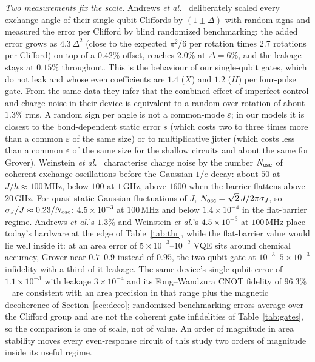 \documentclass[reprint,aps,pra,amsmath,amssymb,superscriptaddress,letterpaper]{revtex4-2}
\begin{document}
\emph{Two measurements fix the scale.} Andrews \emph{et
al.}~\cite{andrews2019} deliberately scaled every exchange angle of their
single-qubit Cliffords by $(1\pm\Delta)$ with random signs and measured the
error per Clifford by blind randomized benchmarking: the added error grows as $4.3\,\Delta^2$ (close to the expected $\pi^2/6$ per rotation times $2.7$ rotations per Clifford) on top of a $0.42\%$ offset, reaches $2.0\%$ at $\Delta=6\%$, and the leakage stays at $0.15\%$ throughout.
This is the behaviour of our single-qubit gates, which do not leak and whose even coefficients are $1.4$ ($X$) and $1.2$ ($H$) per four-pulse gate. From the same data they infer that the combined effect of imperfect control and charge noise in their device is equivalent to a random over-rotation of about $1.3\%$ rms. A random sign per angle is not a common-mode $\varepsilon$; in our models it is closest to the bond-dependent static error $s$ (which costs two to three times more than a common $\varepsilon$ of the same size) or to multiplicative jitter (which costs less than a common $\varepsilon$ of the same size for the shallow circuits and about the same for Grover). Weinstein \emph{et al.}~\cite{weinstein2023} characterise charge noise
by the number $N_{\rm osc}$ of coherent exchange oscillations before the
Gaussian $1/e$ decay: about $50$ at $J/h\approx100$\,MHz, below $100$ at
$1$\,GHz, above $1600$ when the barrier flattens above $20$\,GHz. For
quasi-static Gaussian fluctuations of $J$, $N_{\rm osc}=\sqrt2\,J/2\pi\sigma_J$,
so $\sigma_J/J\approx0.23/N_{\rm osc}$: $4.5\times10^{-3}$ at $100$\,MHz and below $1.4\times10^{-4}$ in the flat-barrier regime. Andrews \emph{et al.}'s $1.3\%$ and Weinstein \emph{et al.}'s $4.5\times10^{-3}$ at $100$\,MHz place today's hardware at the edge of Table~\ref{tab:thr}, while the flat-barrier value would lie well inside it: at an area error of $5\times10^{-3}$--$10^{-2}$ VQE sits around chemical accuracy, Grover near $0.7$--$0.9$ instead of $0.95$, the two-qubit gate at $10^{-3}$--$5\times10^{-3}$ infidelity with a third of it leakage. The same device's single-qubit error of $1.1\times10^{-3}$ with leakage $3\times10^{-4}$ and its Fong--Wandzura CNOT fidelity of $96.3\%$~\cite{weinstein2023} are consistent with an area precision in that range plus the magnetic decoherence of Section~\ref{sec:deco}; randomized-benchmarking errors average over the Clifford group and are not the coherent gate infidelities of Table~\ref{tab:gates}, so the comparison is one of scale, not of value. An order of magnitude in area stability moves every even-response circuit of this study two orders of magnitude inside its useful regime.
\end{document}

